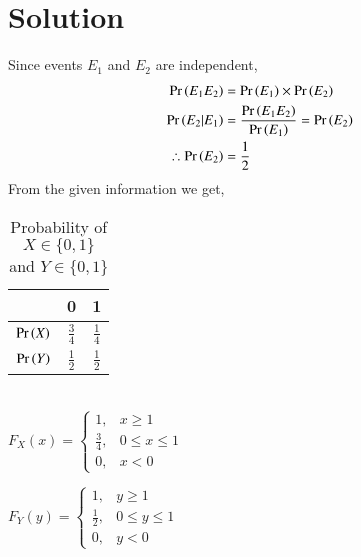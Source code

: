 \documentclass[journal,12pt,twocolumn]{IEEEtran}
\begin{document}
\section*{Solution}
Since events $E_1$ and $E_2$ are independent, 
\begin{align}
    \Pr\left(E_1E_2\right)&=\Pr\left(E_1\right)\times\Pr\left(E_2\right) \nonumber\\
    \Pr\left(E_2|E_1\right)&=\frac{\Pr\left(E_1E_2\right)}{\Pr\left(E_1\right)} = \Pr\left(E_2\right) \nonumber\\
     \therefore \Pr\left(E_2\right) &= \frac{1}{2}
\end{align}
From the given information we get,\\
\begin{table}[h]
\centering
    \begin{tabular}{|c|c|c|}
        \hline
         &0 &1    \\ \hline
        $\Pr\left(X\right)$ &$\frac{3}{4}$ &$\frac{1}{4}$   \\ \hline
        $\Pr\left(Y\right)$ &$\frac{1}{2}$ &$\frac{1}{2}$ \\ \hline
    \end{tabular}
\caption{Probability of $X \in \{0,1\}$ and $Y \in \{0,1\}$}
\label{table=1}
\end{table}
\\
$F_X(x)=
\begin{cases}
1, &x\geq1\\
\frac{3}{4}, & 0\leq x \leq1\\
0, &x<0
\end{cases}$

$F_Y(y)=
\begin{cases}
1, &y\geq1\\
\frac{1}{2}, & 0\leq y \leq1\\
0, &y<0
\end{cases}$
\\
\end{document}
